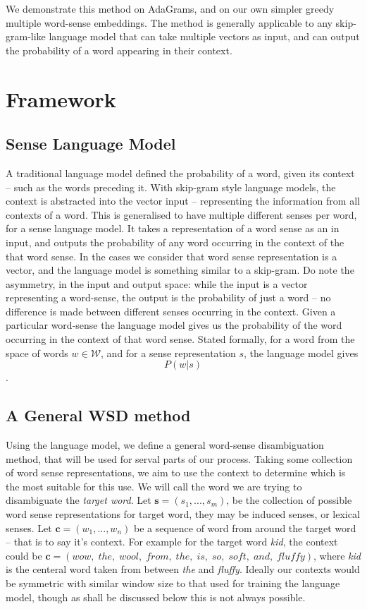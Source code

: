 \documentclass{sig-alternate}
\newcommand{\W}{\mathcal{W}}
\begin{document}
We demonstrate this method on AdaGrams\cite{AdaGrams}, and on our own simpler greedy multiple word-sense embeddings. The method is generally applicable to any skip-gram-like language model that can take multiple vectors as input, and can output the probability of a word appearing in their context.

\section{Framework}


\subsection{Sense Language Model}
A traditional language model defined the probability of a word, given its context -- such as the words preceding it.
With skip-gram style language models, the context is abstracted into the vector input -- representing the information from all contexts of a word. This is generalised to have multiple different senses per word, for a sense language model.
It takes a representation of a word sense as an in input, and outputs the probability of any word occurring in the context of the that word sense. In the cases we consider that word sense representation is a vector, and the language model is something similar to a skip-gram. Do note the asymmetry, in the input and output space: while the input is a vector representing a word-sense, the output is the probability of just a word -- no difference is made between different senses occurring in the context. Given a particular word-sense the language model gives us the probability of the word occurring in the context of that word sense. Stated formally, for a word from the space of words $w\in \W$, and for a sense representation $s$, the language model gives $$P(w | s)$$.

\subsection{A General WSD method}
Using the language model, we define a general word-sense disambiguation method, that will be used for serval parts of our process.
Taking some collection of word sense representations, we aim to use the context to determine which is the most suitable for this use.
We will call the word we are trying to disambiguate the \emph{target word}.
Let $\mathbf{s}=(s_{1},...,s_{m})$, be the collection of possible word sense representations for target word, they may be induced senses, or lexical senses.
Let $\mathbf{c}=(w_{1},...,w_{n})$ be a sequence of word from around the target word -- that is to say it's context.
For example for the target word \emph{kid}, the context could be \mbox{$\mathbf{c}=(wow,\; the,\; wool,\; from,\; the,\; is,\; so,\; soft,\; and,\; fluffy)$}, where \emph{kid} is the centeral word taken from between \emph{the} and \emph{fluffy}.
Ideally our contexts would be symmetric with similar window size to that used for training the language model, though as shall be discussed below this is not always possible.
 
\end{document}

